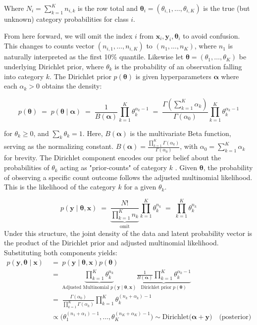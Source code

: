 Where \(N_i = \sum_{k=1}^{K}n_{i,k}\) is the row total and \(\boldsymbol{\theta}_i = (\theta_{i,1},\dots,\theta_{i,K})\) is the true (but unknown) category probabilities for class \(i\). 

From here forward, we will omit the index \(i\) from \(\mathbf{x}_i, \mathbf{y}_i,\boldsymbol{\theta}_i\) to avoid confusion. This changes to counts vector \((n_{i,1}, \dots, n_{i,K})\) to \((n_{1}, \dots, n_{K})\), where \(n_1\) is naturally interpreted as the first 10\% quantile. Likewise let \(\boldsymbol{\theta} = (\theta_1, \dots, \theta_K)\) be underlying Dirichlet prior, where \(\theta_k\) is the probability of an observation falling into category \(k\). The Dirichlet prior \(p(\boldsymbol{\theta})\) is given hyperparameters \(\boldsymbol{\alpha}\) where each \(\alpha_k > 0\) obtains the density:

\[
    p(\boldsymbol{\theta})
    \;=\;
   p(\boldsymbol{\theta} \mid \boldsymbol{\alpha})
    \;=\;
        \frac{1}{B(\boldsymbol{\alpha})} 
    \prod_{k=1}^K \theta_k^{\alpha_k -1}
    \;=\;
    \frac{\Gamma(\sum_{k=1}^K \alpha_k)}{\Gamma(\alpha_0)} 
    \prod_{k=1}^K \theta_k^{\alpha_k -1}
\]

for \(\theta_k \ge 0\), and \(\sum_k \theta_k = 1\). Here, \(B(\boldsymbol{\alpha})\) is the multivariate Beta function, serving as the normalizing constant. \(B(\boldsymbol{\alpha}) = \frac{\prod_{k=1}^K \Gamma(\alpha_k)}{\Gamma(\alpha_0)}\), with \(\alpha_0 = \sum_{k=1}^K \alpha_k\) for brevity. The Dirichlet component encodes our prior belief about the probabilities of \(\theta_k\) acting as "prior-counts" of category \(k\) \parencite{wiki:dirichlet-multinomial}. Given \(\boldsymbol{\theta}\), the probability of observing a specific count outcome follows the adjusted multinomial likelihood. This is the likelihood of the category \(k\) for a given \(\theta_k\).

\[
    p(\mathbf{y} \mid \boldsymbol{\theta}, \mathbf{x}) 
    \;=\;
   \underbrace{\frac{N!}{\prod_{k=1}^K n_k}}_{\text{omit}} \prod_{k=1}^K \theta_k^{n_k} 
    \;=\; 
    \prod_{k=1}^K \theta_k^{n_k} 
\]
Under this structure, the joint density of the data and latent probability vector is the product of the Dirichlet prior and adjusted multinomial likelihood. Substituting both components yields:
\begin{align*}
    p(\mathbf{y}, \boldsymbol{\theta} \mid \mathbf{x}) 
    \;&=\; 
    p(\mathbf{y} \mid \boldsymbol{\theta}, \mathbf{x}) p(\boldsymbol{\theta}) \\
    \;&=\;
    \underbrace{
    \prod_{k=1}^K \theta_k^{n_k}}_{\text{Adjusted Multinomial } p(\mathbf{y} \mid \boldsymbol{\theta}, \mathbf{x})} 
    \underbrace{
    \frac{1}{B(\boldsymbol{\alpha})} 
    \prod_{k=1}^K \theta_k^{\alpha_k -1}
    }_{\text{Dirichlet prior } p(\boldsymbol{\theta})}\\
    \;&=\;
    \frac{\Gamma(\alpha_0)}{\prod_{k=1}^K \Gamma(\alpha_k)} 
    \prod_{k=1}^K \theta_k^{(n_k + \alpha_k) - 1}\\
    &\varpropto \bigl( \theta_1^{(n_1+\alpha_1)-1},\ldots, \theta_K^{(n_K+\alpha_K)-1} \bigr) \sim \mathrm{Dirichlet} \bigl(\boldsymbol{\alpha}+\mathbf{y}\bigr) \quad \text{(posterior)}
\end{align*}


